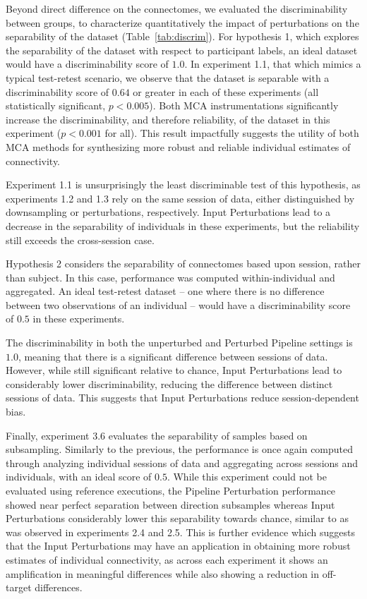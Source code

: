 \documentclass[fleqn,10pt]{SelfArx} %
\begin{document}
Beyond direct difference on the connectomes, we evaluated the discriminability between groups, to characterize
quantitatively the impact of perturbations on the separability of the dataset (Table~\ref{tab:discrim}). For
hypothesis 1, which explores the separability of the dataset with respect to participant labels, an ideal dataset would
have a discriminability score of $1.0$. In experiment 1.1, that which mimics a typical test-retest scenario, we observe
that the dataset is separable with a discriminability score of $0.64$ or greater in each of these experiments (all
statistically significant, $p < 0.005$). Both MCA instrumentations significantly increase the discriminability, and
therefore reliability, of the dataset in this experiment ($p < 0.001$ for all). This result impactfully suggests the
utility of both MCA methods for synthesizing more robust and reliable individual estimates of connectivity.

Experiment 1.1 is unsurprisingly the least discriminable test of this hypothesis, as experiments 1.2 and 1.3 rely on
the same session of data, either distinguished by downsampling or perturbations, respectively. Input Perturbations lead
to a decrease in the separability of individuals in these experiments, but the reliability still exceeds the
cross-session case.

Hypothesis 2 considers the separability of connectomes based upon session, rather than subject. In this case,
performance was computed within-individual and aggregated. An ideal test-retest dataset – one where there is no
difference between two observations of an individual – would have a discriminability score of $0.5$ in these
experiments.

The discriminability in both the unperturbed and Perturbed Pipeline settings is $1.0$, meaning that there is a
significant difference between sessions of data. However, while still significant relative to chance, Input
Perturbations lead to considerably lower discriminability, reducing the difference between distinct sessions of data.
This suggests that Input Perturbations reduce session-dependent bias.

Finally, experiment 3.6 evaluates the separability of samples based on subsampling. Similarly to the previous, the
performance is once again computed through analyzing individual sessions of data and aggregating across sessions and
individuals, with an ideal score of $0.5$. While this experiment could not be evaluated using reference executions, the
Pipeline Perturbation performance showed near perfect separation between direction subsamples whereas Input
Perturbations considerably lower this separability towards chance, similar to as was observed in experiments 2.4 and
2.5. This is further evidence which suggests that the Input Perturbations may have an application in obtaining more
robust estimates of individual connectivity, as across each experiment it shows an amplification in meaningful
differences while also showing a reduction in off-target differences.
\end{document}
